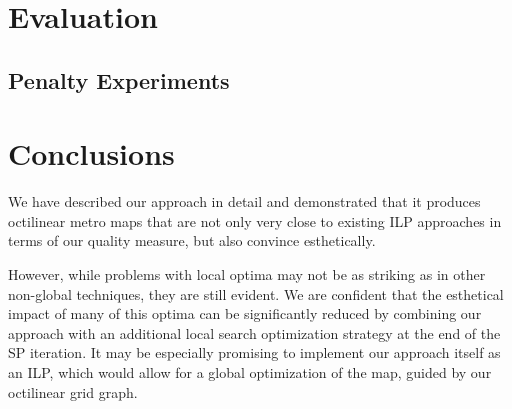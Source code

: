 \documentclass{sig-alternate-sigmod09}
\begin{document}
\section{Evaluation}

\subsection{Penalty Experiments}

\section{Conclusions}

We have described our approach in detail and demonstrated that it produces octilinear metro maps that are not only very close to existing ILP approaches in terms of our quality measure, but also convince esthetically.

However, while problems with local optima may not be as striking as in other non-global techniques, they are still evident. We are confident that the esthetical impact of many of this optima can be significantly reduced by combining our approach with an additional local search optimization strategy at the end of the SP iteration. It may be especially promising to implement our approach itself as an ILP, which would allow for a global optimization of the map, guided by our octilinear grid graph.

\balancecolumns
\end{document}
